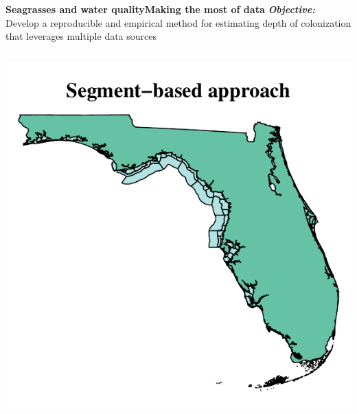 \documentclass[serif]{beamer}\usepackage[]{graphicx}\usepackage[]{color}
\makeatletter
\def\maxwidth{ %
  \ifdim\Gin@nat@width>\linewidth
    \linewidth
  \else
    \Gin@nat@width
  \fi
}
\newenvironment{knitrout}{}{} %
\newcommand{\emtxt}[1]{\textbf{\textit{#1}}}
\makeatother
\begin{document}
\begin{frame}{\textbf{Seagrasses and water quality}}{\textbf{Making the most of data}}
\onslide<+->
\emtxt{Objective:} Develop a reproducible and empirical method for estimating depth of colonization that leverages multiple data sources
\begin{columns}[T]
\begin{column}{0.5\textwidth}
\begin{knitrout}
\color{fgcolor}

{\centering \includegraphics[width=\maxwidth]{fig//segmap} 

}




\end{knitrout}
\end{column}
\end{columns}
\end{frame}
\end{document}
